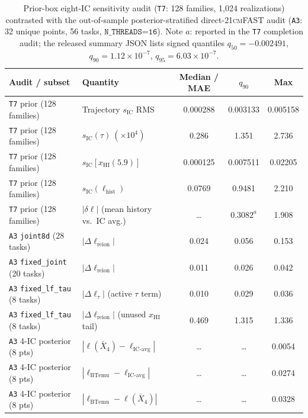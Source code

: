 \documentclass[aps,prd,reprint,superscriptaddress,nofootinbib,amsmath,amssymb,floatfix,longbibliography]{revtex4-2}
\begin{document}
\begin{table}[!tb]
\caption{Prior-box eight-IC sensitivity audit (\texttt{T7}: 128 families, 1,024 realizations) contrasted with the out-of-sample posterior-stratified direct-\textsc{21cmFAST} audit (\texttt{A3}: 32 unique points, 56 tasks, $\texttt{N\_THREADS=16}$). Note $a$: reported in the \texttt{T7} completion audit; the released summary JSON lists signed quantiles $q_{50}=-0.002491$, $q_{90}=1.12\times 10^{-7}$, $q_{95}=6.03\times 10^{-7}$.}
\label{tab:t7_a3}
\begin{ruledtabular}
\begin{tabular}{llccc}
Audit / subset & Quantity & Median / MAE & $q_{90}$ & Max \\
\hline
\texttt{T7} prior (128 families) & Trajectory $s_{\mathrm{IC}}$ RMS & 0.000288 & 0.003133 & 0.005158 \\
\texttt{T7} prior (128 families) & $s_{\mathrm{IC}}(\tau)\ (\times 10^4)$ & 0.286 & 1.351 & 2.736 \\
\texttt{T7} prior (128 families) & $s_{\mathrm{IC}}[x_{\mathrm{HI}}(5.9)]$ & 0.000125 & 0.007511 & 0.02205 \\
\texttt{T7} prior (128 families) & $s_{\mathrm{IC}}(\ell_{\mathrm{hist}})$ & 0.0769 & 0.9481 & 2.210 \\
\texttt{T7} prior (128 families) & $|\delta\ell|$ (mean history vs.\ IC avg.) & \dots & $0.3082^{a}$ & 1.908 \\
\hline
\texttt{A3} \texttt{joint8d} (28 tasks) & $|\Delta\ell_{\mathrm{reion}}|$ & 0.024 & 0.056 & 0.153 \\
\texttt{A3} \texttt{fixed\_joint} (20 tasks) & $|\Delta\ell_{\mathrm{reion}}|$ & 0.011 & 0.026 & 0.042 \\
\texttt{A3} \texttt{fixed\_lf\_tau} (8 tasks) & $|\Delta\ell_{\tau}|$ (active $\tau$ term) & 0.010 & 0.029 & 0.036 \\
\texttt{A3} \texttt{fixed\_lf\_tau} (8 tasks) & $|\Delta\ell_{\mathrm{reion}}|$ (unused $x_{\mathrm{HI}}$ tail) & 0.469 & 1.315 & 1.336 \\
\texttt{A3} 4-IC posterior (8 pts) & $|\ell(\bar{X}_4)-\ell_{\mathrm{IC\text{-}avg}}|$ & \dots & \dots & 0.0054 \\
\texttt{A3} 4-IC posterior (8 pts) & $|\ell_{\mathrm{BTemu}}-\ell_{\mathrm{IC\text{-}avg}}|$ & \dots & \dots & 0.0274 \\
\texttt{A3} 4-IC posterior (8 pts) & $|\ell_{\mathrm{BTemu}}-\ell(\bar{X}_4)|$ & \dots & \dots & 0.0328 \\
\end{tabular}
\end{ruledtabular}
\end{table}
\end{document}
